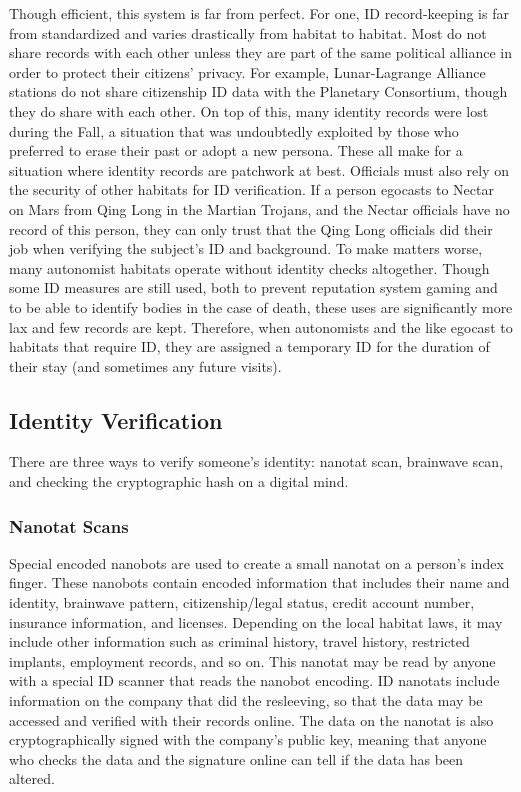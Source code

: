 Though efficient, this system is far from perfect. For one, ID record-keeping is far from standardized and varies drastically from habitat to habitat. Most do not share records with each other unless they are part of the same political alliance in order to protect their citizens' privacy. For example, Lunar-Lagrange Alliance stations do not share citizenship ID data with the Planetary Consortium, though they do share with each other. On top of this, many identity records were lost during the Fall, a situation that was undoubtedly exploited by those who preferred to erase their past or adopt a new persona. These all make for a situation where identity records are patchwork at best. Officials must also rely on the security of other habitats for ID verification. If a person egocasts to Nectar on Mars from Qing Long in the Martian Trojans, and the Nectar officials have no record of this person, they can only trust that the Qing Long officials did their job when verifying the subject's ID and background. To make matters worse, many autonomist habitats operate without identity checks altogether. Though some ID measures are still used, both to prevent reputation system gaming and to be able to identify bodies in the case of death, these uses are significantly more lax and few records are kept. Therefore, when autonomists and the like egocast to habitats that require ID, they are assigned a temporary ID for the duration of their stay (and sometimes any future visits). 

\subsection{Identity Verification} 

There are three ways to verify someone's identity: nanotat scan, brainwave scan, and checking the cryptographic hash on a digital mind. 

\subsubsection{Nanotat Scans} 

Special encoded nanobots are used to create a small nanotat on a person's index finger. These nanobots contain encoded information that includes their name and identity, brainwave pattern, citizenship/legal status, credit account number, insurance information, and licenses. Depending on the local habitat laws, it may include other information such as criminal history, travel history, restricted implants, employment records, and so on. This nanotat may be read by anyone with a special ID scanner that reads the nanobot encoding. ID nanotats include information on the company that did the resleeving, so that the data may be accessed and verified with their records online. The data on the nanotat is also cryptographically signed with the company's public key, meaning that anyone who checks the data and the signature online can tell if the data has been altered. 

